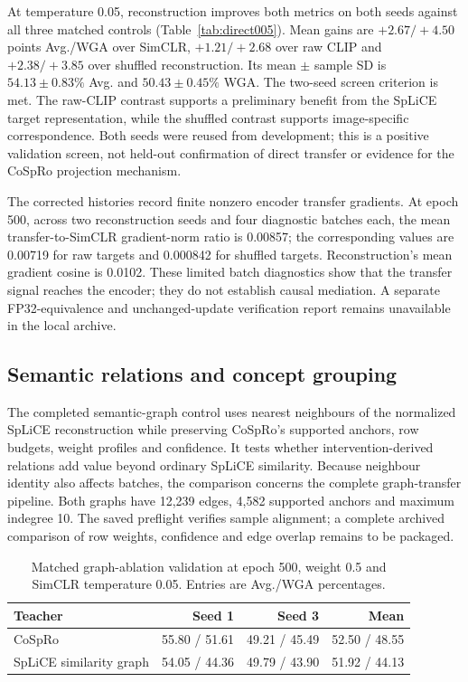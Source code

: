 \documentclass{article}
\begin{document}
At temperature 0.05, reconstruction improves both metrics on both seeds
against all three matched controls (Table~\ref{tab:direct005}). Mean gains
are $+2.67/+4.50$ points Avg./WGA over SimCLR, $+1.21/+2.68$ over raw CLIP
and $+2.38/+3.85$ over shuffled reconstruction. Its mean $\pm$ sample SD
is $54.13\pm0.83\%$ Avg. and $50.43\pm0.45\%$ WGA. The two-seed screen
criterion is met. The raw-CLIP contrast supports a preliminary benefit from
the SpLiCE target representation, while the shuffled contrast supports
image-specific correspondence. Both seeds were reused from development;
this is a positive validation screen, not held-out confirmation of direct
transfer or evidence for the CoSpRo projection mechanism.

The corrected histories record finite nonzero encoder transfer gradients.
At epoch 500, across two reconstruction seeds and four diagnostic batches
each, the mean transfer-to-SimCLR gradient-norm ratio is 0.00857; the
corresponding values are 0.00719 for raw targets and 0.000842 for shuffled
targets. Reconstruction's mean gradient cosine is 0.0102. These limited
batch diagnostics show that the transfer signal reaches the encoder; they
do not establish causal mediation. A separate FP32-equivalence and
unchanged-update verification report remains unavailable in the local archive.


\subsection{Semantic relations and concept grouping}
The completed semantic-graph control uses nearest neighbours of the normalized
SpLiCE reconstruction while preserving CoSpRo's supported anchors, row budgets,
weight profiles and confidence. It tests whether intervention-derived relations
add value beyond ordinary SpLiCE similarity. Because neighbour identity also
affects batches, the comparison concerns the complete graph-transfer pipeline.
Both graphs have 12,239 edges, 4,582 supported anchors and maximum indegree 10.
The saved preflight verifies sample alignment; a complete archived comparison
of row weights, confidence and edge overlap remains to be packaged.

\begin{table}[htbp]
\centering\small
\setlength{\tabcolsep}{4pt}
\caption{Matched graph-ablation validation at epoch 500, weight 0.5 and SimCLR temperature 0.05. Entries are Avg./WGA percentages.}
\begin{tabular}{lrrr}
\toprule
Teacher & Seed 1 & Seed 3 & Mean \\
\midrule
CoSpRo & 55.80 / 51.61 & 49.21 / 45.49 & 52.50 / 48.55 \\
SpLiCE similarity graph & 54.05 / 44.36 & 49.79 / 43.90 & 51.92 / 44.13 \\
\bottomrule
\end{tabular}
\label{tab:semantic}
\end{table}
\end{document}
